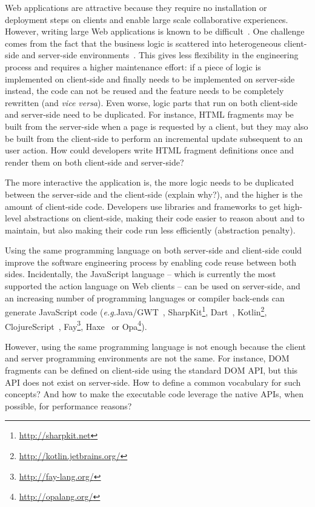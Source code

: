\documentclass[preprint]{sigplanconf}
\newcommand{\eg}{\emph{e.g.}}
\begin{document}
Web applications are attractive because they require no installation or deployment steps on clients and enable large
scale collaborative experiences. However, writing large Web applications is known to be
difficult~\cite{Mikkonen08_SpaghettiJs,Preciado05_RIAMethodologyNecessity}. One challenge comes from the fact
that the business logic is scattered into heterogeneous client-side and server-side
environments~\cite{Echeverria09_RIA,Kuuskeri09_PartitioningClientServer}. This gives less flexibility in the
engineering process and requires a higher maintenance effort: if a piece of logic is implemented on client-side and
finally needs to be implemented on server-side instead, the code can not be reused and the feature needs to be
completely rewritten (and \emph{vice versa}). Even worse, logic parts that run on both client-side and server-side
need to be duplicated. For instance, HTML fragments may be built from the server-side when a page is requested by a
client, but they may also be built from the client-side to perform an incremental update subsequent to an user
action. How could developers write HTML fragment definitions once and render them on both client-side and
server-side?

The more interactive the application is, the more logic needs to be duplicated between the server-side
and the client-side (explain why?), and the higher is the amount of client-side code. Developers use libraries and
frameworks to get high-level abstractions on client-side, making their code easier to reason about and to
maintain, but also making their code run less efficiently (abstraction penalty).

Using the same programming language on both server-side and client-side could improve the software engineering
process by enabling code reuse between both sides. Incidentally, the JavaScript language -- which is currently the
most supported the action language on Web clients -- can be used on server-side, and an increasing number of
programming languages or compiler back-ends can generate JavaScript code (\eg Java/GWT~\cite{Chaganti07_GWT},
SharpKit\footnote{\href{http://sharpkit.net}{http://sharpkit.net}}, Dart~\cite{Griffith11_Dart},
Kotlin\footnote{\href{http://kotlin.jetbrains.org/}{http://kotlin.jetbrains.org/}},
ClojureScript~\cite{McGranaghan11_ClojureScript}, Fay\footnote{\href{http://fay-lang.org/}{http://fay-lang.org/}},
Haxe~\cite{Cannasse08_HaXe} or Opa\footnote{\href{http://opalang.org/}{http://opalang.org/}}).

However, using the same programming language is not enough because the client and server programming environments
are not the same. For instance, DOM fragments can be defined on client-side using the standard DOM API, but this
API does not exist on server-side. How to define a common vocabulary for such concepts? And how to make the
executable code leverage the native APIs, when possible, for performance reasons?
\end{document}

